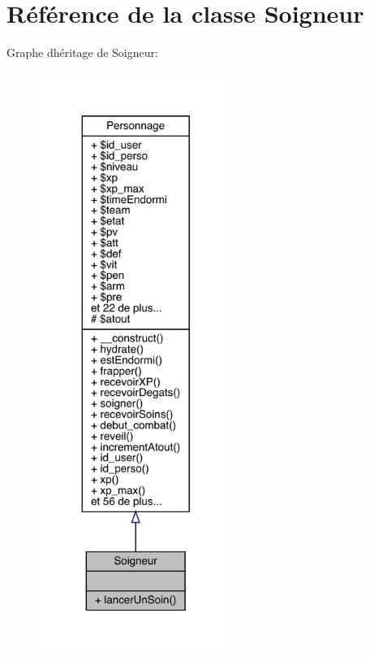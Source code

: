 \hypertarget{class_soigneur}{}\section{Référence de la classe Soigneur}
\label{class_soigneur}


Graphe d\textquotesingle{}héritage de Soigneur\+:\nopagebreak
\begin{figure}[H]
\begin{center}
\leavevmode
\includegraphics[width=179pt]{class_soigneur__inherit__graph}
\end{center}
\end{figure}


